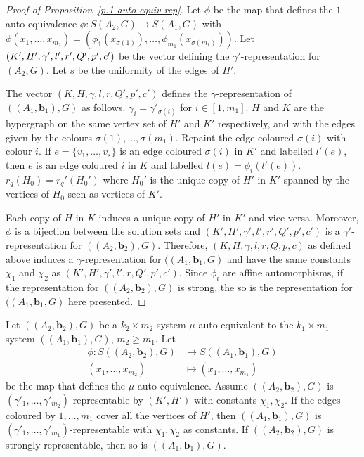  \begin {proof} 
 [Proof of Proposition~\ref {p.1-auto-equiv-rep}] Let $\phi $ be the map that defines the $1$-auto-equivalence $\phi : S(A_2,G) \to S(A_1,G)$ with $\phi (x_1,\ldots ,x_{m_2})=\left (\phi _1(x_{\sigma (1)}),\ldots ,\phi _{m_1}(x_{\sigma (m_1)})\right )$. Let $(K',H', \gamma ',\linebreak [1] l', r', Q', p', c')$ be the vector defining the $\gamma '$-representation for $(A_2,G)$. Let $s$ be the uniformity of the edges of $H'$. \par The vector $(K,H,\gamma ,l,r,Q',p',c')$ defines the $\gamma $-representation of $((A_1,\mathbf {b}_1),G)$ as follows. $\gamma _i=\gamma '_{\sigma (i)}$ for $i\in [1,m_1]$. $H$ and $K$ are the hypergraph on the same vertex set of $H'$ and $K'$ respectively, and with the edges given by the colours $\sigma (1),\ldots ,\sigma (m_1)$. Repaint the edge coloured $\sigma (i)$ with colour $i$. If $e=\{v_1,\ldots ,v_s\}$ is an edge coloured $\sigma (i)$ in $K'$ and labelled $l'(e)$, then $e$ is an edge coloured $i$ in $K$ and labelled $l(e)=\phi _i(l'(e))$. $r_q(H_0)=r_q'(H_0')$ where $H_0'$ is the unique copy of $H'$ in $K'$ spanned by the vertices of $H_0$ seen as vertices of $K'$. \par \par \par Each copy of $H$ in $K$ induces a unique copy of $H'$ in $K'$ and vice-versa. Moreover, $\phi $ is a bijection between the solution sets and $(K',H',\gamma ',l',r',Q',p',c')$ is a $\gamma '$-representation for $((A_2,\mathbf {b}_2),G)$. Therefore, $(K,H,\gamma ,l,r,Q,p,c)$ as defined above induces a $\gamma $-representation for $((A_1,\mathbf {b}_1,G)$ and have the same constants $\chi _1$ and $\chi _2$ as $(K',H',\gamma ',l',r,Q',p',c')$. Since $\phi _i$ are affine automorphisms, if the representation for $((A_2,\mathbf {b}_2),G)$ is strong, the so is the representation for $((A_1,\mathbf {b}_1,G)$ here presented.
 \end {proof} 
 
 \begin {proposition} 
  \label {p.mu-auto-equivalent} Let $((A_2,\mathbf {b}_2),G)$ be a $k_2\times m_2$ system $\mu $-auto-equivalent to the $k_1\times m_1$ system $((A_1,\mathbf {b}_1),G)$, $m_2\geq m_1$. Let \begin {align} \phi :S((A_2,\mathbf {b}_2),G)&\longrightarrow S((A_1,\mathbf {b}_1),G) \nonumber \\ (x_1,\ldots ,x_{m_2}) &\longmapsto \left (x_{1},\ldots ,x_{m_1}\right ) \nonumber \end {align} be the map that defines the $\mu $-auto-equivalence. Assume $((A_2,\mathbf {b}_2),G)$ is $(\gamma '_1,\ldots ,\gamma '_{m_2})$-representable by $(K',H')$ with constants $\chi _1,\chi _2$. If the edges coloured by $1,\ldots ,m_1$ cover all the vertices of $H'$, then $((A_1,\mathbf {b}_1),G)$ is $(\gamma '_{1},\ldots ,\gamma '_{m_1})$-representable with $\chi _1,\chi _2$ as constants. If $((A_2,\mathbf {b}_2),G)$ is strongly representable, then so is $((A_1,\mathbf {b}_1),G)$.
 \end {proposition} 
 
